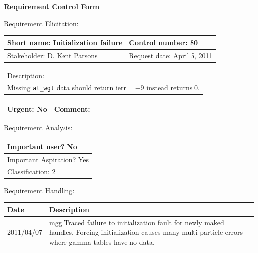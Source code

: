 \begin{center}\Large\bf
Requirement Control Form
\end{center}
\vspace{24pt}

Requirement Elicitation:

\begin{tabular}{|p{211pt}|p{211pt}|} \hline
Short name: Initialization failure & Control number: 80\\ \hline
Stakeholder: D. Kent Parsons & Request date: April 5, 2011\\
\end{tabular}
\begin{tabular}{|p{433pt}|} \hline
Description: \\ 
Missing \texttt{at\_wgt} data should return $\mathrm{ierr}=-9$ instead
returns 0.\\
\hline
\end{tabular} 
\begin{tabular}{|p{211pt}|p{211pt}|} \hline
Urgent: No & Comment: \\ \hline
\end{tabular}

\vspace{24pt}

Requirement Analysis:

\begin{tabular}{|p{433pt}|} \hline
Important user? No \\ \hline
Important Aspiration? Yes \\ \hline
Classification: 2 \\ \hline
\end{tabular}
\vspace{24pt}

Requirement Handling:

\begin{tabular}{|p{72pt}|p{351pt}|} \hline
Date & Description \\ \hline
2011/04/07 & mgg Traced failure to initialization fault for newly
maked handles.  Forcing initialization causes many multi-particle
errors where gamma tables have no data. \\ \hline 
\end{tabular}
